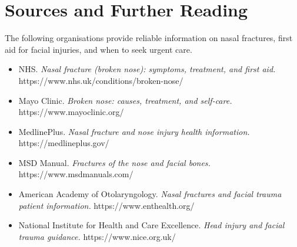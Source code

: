 \section*{Sources and Further Reading}
The following organisations provide reliable information on nasal fractures, first aid for facial injuries, and when to seek urgent care.

\begin{itemize}
    \item NHS. \textit{Nasal fracture (broken nose): symptoms, treatment, and first aid.} https://www.nhs.uk/conditions/broken-nose/
    \item Mayo Clinic. \textit{Broken nose: causes, treatment, and self-care.} https://www.mayoclinic.org/
    \item MedlinePlus. \textit{Nasal fracture and nose injury health information.} https://medlineplus.gov/
    \item MSD Manual. \textit{Fractures of the nose and facial bones.} https://www.msdmanuals.com/
    \item American Academy of Otolaryngology. \textit{Nasal fractures and facial trauma patient information.} https://www.enthealth.org/
    \item National Institute for Health and Care Excellence. \textit{Head injury and facial trauma guidance.} https://www.nice.org.uk/
\end{itemize}
